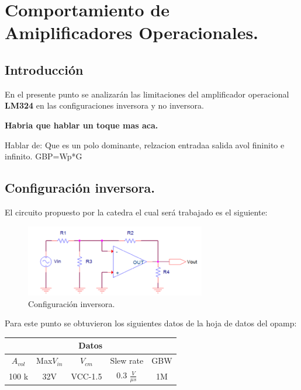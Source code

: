 



\section{Comportamiento de Amiplificadores Operacionales.}

\subsection{Introducción}
En el presente punto se analizarán las limitaciones del amplificador operacional  \textbf{LM324} en las configuraciones inversora y no inversora.
\begin{center}  \textbf{Habria que hablar un toque mas aca.} \end{center}
 Hablar de: Que es un polo dominante, relzacion entradaa salida avol fininito e infinito.
GBP=Wp*G
\subsection{Configuración inversora.}
El circuito propuesto por la catedra el cual será trabajado es el siguiente:

\begin{figure}[htb]	
	\centering
	\includegraphics[width=0.7\textwidth]{Ejercicio1/Imagenes/Circuitoinversor.PNG}
	\caption{Configuración inversora.}
	\label{fig:ConfInv}
\end{figure}
Para este punto se obtuvieron los siguientes datos de la hoja de datos del opamp:
\begin{table}[H]
\begin{center}
\begin{tabular}{|c|c|c|c|c|}
\hline
\multicolumn{5}{|c|}{\textbf{Datos}}                                      \\ \hline
\textbf{$A_{vol}$} & Max$V_{in}$ & $V_{cm}$ & Slew rate             & GBW \\ \hline
100 k              & 32V         & VCC-1.5  & 0.3 $\frac{V}{\mu s}$ & 1M  \\ \hline
\end{tabular}
\end{center}
\end{table}

